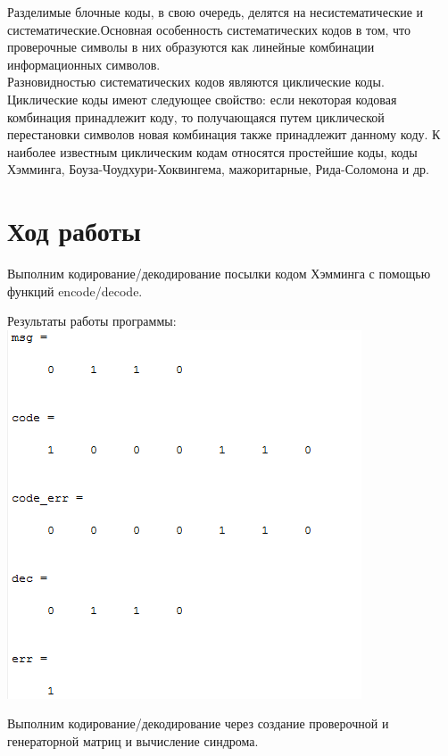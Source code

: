 \documentclass[a4paper]{article}
\begin{document}
Разделимые блочные коды, в свою очередь, делятся на несистематические и систематические.Основная особенность систематических кодов в том, что проверочные символы в них образуются как линейные комбинации информационных символов.\\

Разновидностью систематических кодов являются циклические коды. Циклические коды имеют следующее свойство: если некоторая кодовая комбинация принадлежит коду, то получающаяся путем циклической перестановки символов новая комбинация также принадлежит данному коду. К наиболее известным циклическим кодам относятся простейшие коды, коды Хэмминга, Боуза-Чоудхури-Хоквингема, мажоритарные, Рида-Соломона и др.
 
\section{Ход работы}
Выполним кодирование/декодирование посылки кодом Хэмминга с помощью функций encode/decode.



Результаты работы программы: \\
\includegraphics[scale = 0.7]{res1.png}

Выполним кодирование/декодирование через создание проверочной и генераторной матриц и вычисление синдрома.


\end{document}
